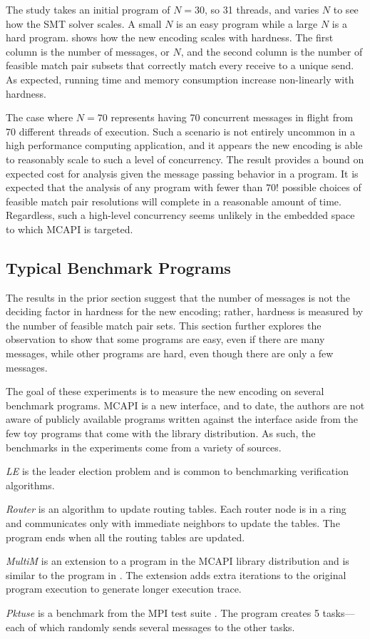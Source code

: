 The study takes an initial program of $N = 30$, so 31 threads, and
varies $N$ to see how the SMT solver scales. A small $N$ is an easy
program while a large $N$ is a hard program. 
shows how the new encoding scales with hardness. The first column is
the number of messages, or $N$, and the second column is the number of
feasible match pair subsets that correctly match every receive to a
unique send. As expected, running time and memory consumption increase
non-linearly with hardness.

The case where $N=70$ represents having 70 concurrent messages in
flight from 70 different threads of execution. Such a scenario is not
entirely uncommon in a high performance computing application, and it
appears the new encoding is able to reasonably scale to such a level
of concurrency. The result provides a bound on expected cost for
analysis given the message passing behavior in a program. It is
expected that the analysis of any program with fewer than $70!$
possible choices of feasible match pair resolutions will complete in a
reasonable amount of time. Regardless, such a high-level concurrency
seems unlikely in the embedded space to which MCAPI is targeted.

\subsection{Typical Benchmark Programs}
The results in the prior section suggest that the number of messages
is not the deciding factor in hardness for the new encoding; rather,
hardness is measured by the number of feasible match pair sets. This
section further explores the observation to show that some programs
are easy, even if there are many messages, while other programs are
hard, even though there are only a few messages.

The goal of these experiments is to measure the new encoding on
several benchmark programs. MCAPI is a new interface, and to date, the
authors are not aware of publicly available programs written against
the interface aside from the few toy programs that come with the
library distribution. As such, the benchmarks in the experiments come
from a variety of sources.
\begin{compactitem}
\item \textit{LE} is the leader election problem and is common to
  benchmarking verification algorithms.
\item \textit{Router} is an algorithm to update routing tables. Each
  router node is in a ring and communicates only with immediate
  neighbors to update the tables. The program ends when all the
  routing tables are updated.
\item \textit{MultiM} is an extension to a program in the MCAPI library
  distribution and is similar to the program in . The extension adds extra
  iterations to the original program execution to generate longer
  execution trace.
\item \textit{Pktuse} is a benchmark from the MPI test suite
  \cite{mpptest_benchmark}. The program creates 5 tasks---each of
  which randomly sends several messages to the other tasks.
\end{compactitem}

